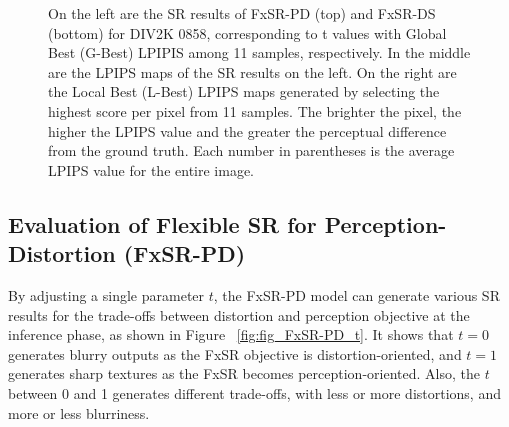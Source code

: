 \documentclass{article}
\begin{document}
\begin{figure*}[!t]
\centering
\begin{minipage}[t]{1.0\linewidth}
    \centering
    \hfill
    \hfill
    \vfill
    \vspace{0.3cm}

    \hfill
    \hfill
    \vfill
    \vspace{0.3cm}
    
\end{minipage}
\caption{On the left are the SR results of FxSR-PD (top) and FxSR-DS (bottom) for DIV2K 0858, corresponding to t values with Global Best (G-Best) LPIPIS among 11 samples, respectively. In the middle are the LPIPS maps of the SR results on the left. On the right are the Local Best (L-Best) LPIPS maps generated by selecting the highest score per pixel from 11 samples. The brighter the pixel, the higher the LPIPS value and the greater the perceptual difference from the ground truth. Each number in parentheses is the average LPIPS value for the entire image.}
\label{fig:fig_DS_DIV_LOC}
\end{figure*}

\subsection{Evaluation of Flexible SR for Perception-Distortion (FxSR-PD)}
By adjusting a single parameter $t$, the FxSR-PD model can generate various SR results for the trade-offs between distortion and perception objective at the inference phase, as shown in Figure ~\ref{fig:fig_FxSR-PD_t}. It shows that $t=0$ generates blurry outputs as the FxSR objective is distortion-oriented, and $t=1$ generates sharp textures as the FxSR becomes perception-oriented. Also, the $t$ between 0 and 1 generates different trade-offs, with less or more distortions, and more or less blurriness.
\end{document}

